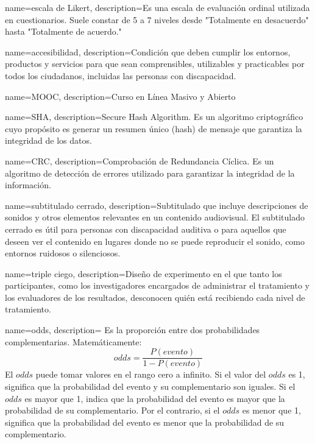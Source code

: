 \cleardoublepage
{}

{
    name=escala de Likert,
    description={Es una escala de evaluación ordinal utilizada en cuestionarios. Suele constar de 5 a 7 niveles desde "Totalmente en desacuerdo" hasta "Totalmente de acuerdo."}
}

{
    name=accesibilidad,
    description={Condición que deben cumplir los entornos, productos y servicios para que sean comprensibles, utilizables y practicables por todos los ciudadanos, incluidas las personas con discapacidad.}
}


{
    name=MOOC,
    description={Curso en Línea Masivo y Abierto}
}


{
    name=SHA,
    description={Secure Hash Algorithm.
    Es un algoritmo criptográfico cuyo propósito es generar un resumen único (hash) de mensaje
    que garantiza la integridad de los datos.
    }
}


{
    name=CRC,
    description={Comprobación de Redundancia Cíclica.
    Es un algoritmo de detección de errores utilizado para garantizar la integridad de la información.
    }
}


{
    name=subtitulado cerrado,
    description={Subtitulado que incluye descripciones de sonidos y otros elementos relevantes en un contenido audiovisual.
    El subtitulado cerrado es útil para personas con discapacidad auditiva o para aquellos que deseen ver
    el contenido en lugares donde no se puede reproducir el sonido, como entornos ruidosos o silenciosos.
    }
}


{
    name=triple ciego,
    description={Diseño de experimento en el que tanto los participantes,
    como los investigadores encargados de administrar el tratamiento y
    los evaluadores de los resultados, desconocen quién está recibiendo cada nivel de tratamiento.}
}


{
    name=odds,
    description={
        Es la proporción entre dos probabilidades complementarias. Matemáticamente:
    $$
        odds = \frac{P(evento)}{1- P(evento)}
    $$
    El $odds$ puede tomar valores en el rango cero a infinito.
    Si el valor del $odds$ es 1, significa que la probabilidad del evento y su complementario son iguales.
    Si el $odds$ es mayor que 1, indica que la probabilidad del evento es mayor que la probabilidad de su complementario.
    Por el contrario, si el $odds$ es menor que 1, significa que la probabilidad del evento es menor que
    la probabilidad de su complementario.}
}

